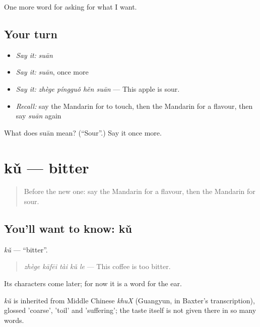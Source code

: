 \begin{grammarlens}[title={What you've built}]
One more word for asking for what I want.
\end{grammarlens}

\subsection*{Your turn}
\begin{itemize}
\raggedright
  \item \emph{Say it:} \emph{suān}
  \item \emph{Say it:} \emph{suān}, once more
  \item \emph{Say it:} \emph{zhège píngguǒ hěn suān} — This apple is sour.
  \item \emph{Recall:} say the Mandarin for to touch, then the Mandarin for a flavour, then say \emph{suān} again
\end{itemize}

\begin{tcolorbox}[breakable,colback=teal!4,colframe=teal!35!black,title={Before you move on}]
What does suān mean? (\textquotedblleft{}Sour\textquotedblright{}.) Say it once more.
\end{tcolorbox}
\section[kǔ]{kǔ — bitter}

\label{lesson:ZH-C172-ku}



\begin{quote}
Before the new one: say the Mandarin for a flavour, then the Mandarin for sour.
\end{quote}

\subsection*{You'll want to know: kǔ}
\emph{kǔ} — \textquotedblleft{}bitter\textquotedblright{}.

\begin{quote}
\emph{zhège kāfēi tài kǔ le} — This coffee is too bitter.
\end{quote}

Its characters come later; for now it is a word for the ear.

\begin{cousinweb}
\emph{kǔ} is inherited from Middle Chinese \emph{khuX} (Guangyun, in Baxter's transcription), glossed 'coarse', 'toil' and 'suffering'; the taste itself is not given there in so many words.
\end{cousinweb}

